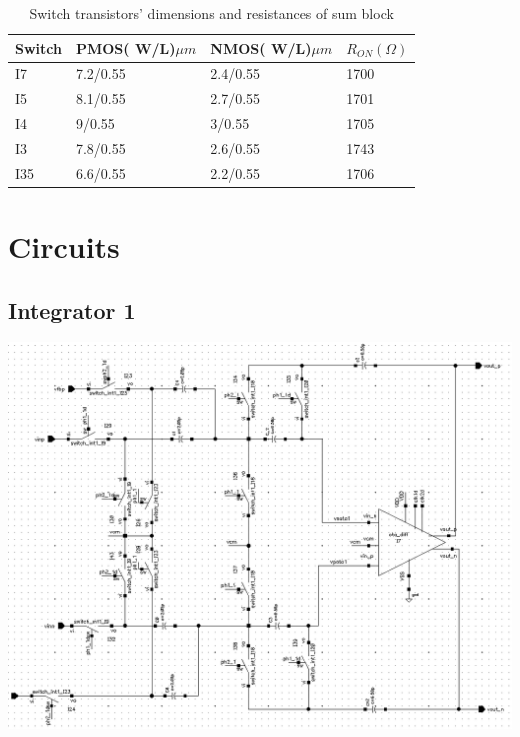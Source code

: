 \begin{appendices}
\begin{table}[H]
\centering
\caption{Switch transistors' dimensions and resistances of sum block}
\label{R_on_sum}
\begin{tabular}{|l|l|l|l|}
\hline
Switch & PMOS( W/L)$\mu m$ & NMOS( W/L)$\mu m$ & $R_{ON} (\Omega)$   \\ \hline
I7    & 7.2/0.55  & 2.4/0.55   & 1700 \\ \hline
I5     & 8.1/0.55  & 2.7/0.55   & 1701 \\ \hline
I4    & 9/0.55  & 3/0.55   & 1705 \\ \hline
I3    & 7.8/0.55  & 2.6/0.55   & 1743 \\ \hline
I35    & 6.6/0.55  & 2.2/0.55   & 1706 \\ \hline
\end{tabular}
\end{table}

\chapter{Circuits}\label{app:cicuits}

\section{Integrator 1}
\label{app:integrator_1}
\begin{center}
\includegraphics[width=\textwidth]{images/Integrator_1.png}
\end{center}


\end{appendices}
